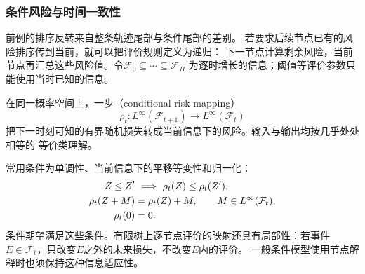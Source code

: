 \subsubsection{条件风险与时间一致性}

前例的排序反转来自整条轨迹尾部与条件尾部的差别。
若要求后续节点已有的风险排序传到当前，就可以把评价规则定义为递归：
下一节点计算剩余风险，当前节点再汇总这些风险值。令$\mathcal F_0\subseteq\cdots\subseteq\mathcal F_H$
为逐时增长的信息；阈值等评价参数只能使用当时已知的信息。
\begin{definition}[一步条件风险映射]
\label{def:decision-conditional-risk-mapping}
在同一概率空间上，一步（conditional risk mapping）
\[
  \rho_t:L^\infty(\mathcal F_{t+1})\longrightarrow L^\infty(\mathcal F_t)
\]
把下一时刻可知的有界随机损失转成当前信息下的风险。输入与输出均按几乎处处相等的
等价类理解。
\end{definition}
常用条件为单调性、当前信息下的平移等变性和归一化：
\begin{align}
  Z\leq Z'&\ \Longrightarrow\ \rho_t(Z)\leq\rho_t(Z'),
  \label{eq:decision-conditional-risk-monotonicity}\\
  \rho_t(Z+M)&=\rho_t(Z)+M,\qquad M\in L^\infty(\mathcal F_t),
  \label{eq:decision-conditional-risk-translation}\\
  \rho_t(0)&=0.\notag
\end{align}
条件期望满足这些条件。有限树上逐节点评价的映射还具有局部性：若事件
$E\in\mathcal F_t$，只改变$E$之外的未来损失，不改变$E$内的评价。
一般条件模型使用节点解释时也须保持这种信息适应性。

